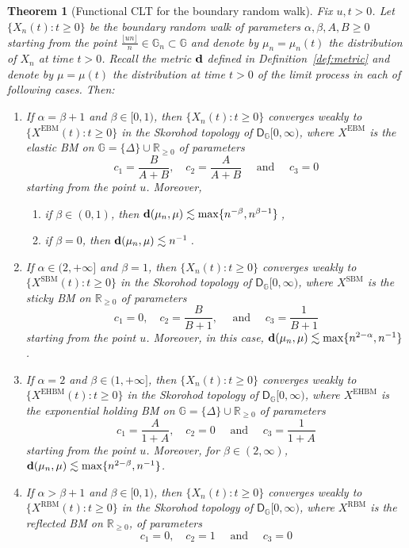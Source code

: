 \documentclass[12pt,a4paper]{article}
\theoremstyle{plain}
\newtheorem{theorem}{Theorem}[section]
\theoremstyle{remark}
\newcommand{\msf}[1]{{\mathsf #1}}
\newcommand{\bb}[1]{{\mathbb #1}}
\begin{document}
	\begin{theorem}[Functional CLT for the boundary random walk]\label{thm26}
		Fix $u,t>0$.	Let $\{X_n(t): t\geq 0\}$ be the boundary random walk of parameters $\alpha, \beta, A, B\geq 0$ starting from the point $\frac{\lfloor un \rfloor}{n}\in \bb G_n\subset \bb G$  and denote by $\mu_n = \mu_n(t)$ the distribution of $X_n$ at time $t>0$. Recall the metric ${\bf d}$ defined in Definition~\ref{def:metric} and denote by $\mu=\mu(t)$ the distribution at time $t>0$ of the limit process in each of following cases.   Then:
		\begin{enumerate}[leftmargin=*]
			\item If $\alpha=\beta +1$ and $\beta\in[0,1)$, then $\{X_n(t): t\geq 0\}$ converges weakly to $\{X^\text{EBM}(t):t\geq 0\}$ in the Skorohod topology of $\msf{D}_{\bb{G}}[0, \infty)$, where $X^\text{EBM}$ is  the elastic BM on $\bb G= \{\Delta\}\cup \bb R_{\geq 0}$ of parameters
			$$c_1 = \frac{B}{A+B},\quad c_2= \frac{A}{A+B} \quad \text{ and }\quad  c_3=0$$
			starting from the point $u$. Moreover,\medskip
			\begin{enumerate}
				\item if $\beta \in (0,1)$, then ${\bf d}(\mu_n,\mu) \lesssim \max\{n^{-\beta},n^{\beta-1}\}$\,,
				\item if $\beta = 0$, then ${\bf d}(\mu_n,\mu) \lesssim n^{-1}$\,.
			\end{enumerate}
			\medskip
			\item If $\alpha \in (2,+\infty]$  and $\beta =1$, then $\{X_n(t): t\geq 0\}$ converges weakly to $\{X^\text{SBM}(t): t \geq 0\}$ in the Skorohod topology of $\msf{D}_{\bb G}[0,\infty)$, where $X^\text{SBM}$ is  the sticky BM  on $\bb R_{\geq 0}$ of parameters $$c_1 = 0,\quad c_2 = \frac{B}{B + 1}, \quad \text{ and }\quad c_3 = \frac{1}{B + 1}$$
			starting from the point $u$. Moreover, in this case,  ${\bf d}(\mu_n,\mu) \lesssim \max\{n^{2 - \alpha},n^{-1}\}$.
			\item If $\alpha =2$ and $\beta\in(1,+\infty]$,  then  $\{X_n(t): t\geq 0\}$ converges weakly to $ \{X^\text{EHBM}(t):t\geq 0\}$ in the Skorohod topology of $\msf{D}_\bb{G}[0, \infty)$, where $X^\text{EHBM}$ is  the exponential holding BM  on $\bb G= \{\Delta\}\cup \bb R_{\geq 0}$ of parameters $$c_1 = \frac{A}{1+A},\quad c_2 = 0 \quad \text{ and }\quad c_3 = \frac{1}{ 1+A}$$
			starting from the point $u$. Moreover, for $\beta \in (2, \infty)$, ${\bf d}(\mu_n,\mu) \lesssim \max\{n^{2 - \beta}, n^{-1}\}$.
			\item If $\alpha>\beta +1$ and $\beta\in[0,1)$, then $\{X_n(t): t\geq 0\}$ converges weakly to $\{X^\text{RBM}(t): t\geq 0\}$ in the Skorohod topology of $\msf{D}_{\bb G}[0, \infty)$, where $X^\text{RBM}$ is  the reflected BM on $\bb{R}_{\geq 0}$, of parameters $$c_1 = 0,\quad c_2= 1 \quad \text{ and }\quad c_3=0$$

\end{enumerate}
\end{theorem}
\end{document}

